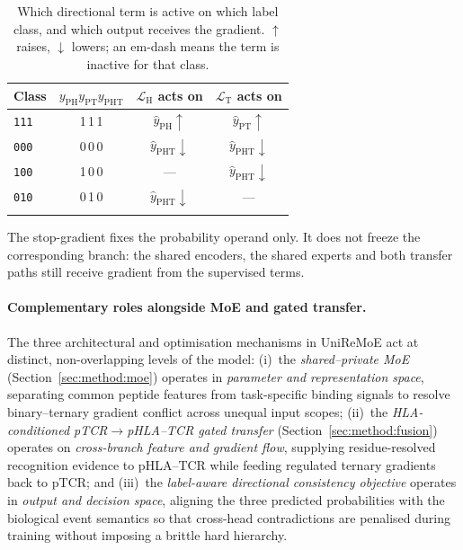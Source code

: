 \documentclass[webpdf,modern,large,namedate]{oup-authoring-template}
\theoremstyle{thmstyleone}
\theoremstyle{thmstyletwo}
\theoremstyle{thmstylethree}
\newcommand{\method}{UniReMoE}
\newcommand{\PT}{pTCR}
\newcommand{\PHT}{pHLA--TCR}
\newcommand{\PHm}{\mathrm{PH}}
\newcommand{\PTm}{\mathrm{PT}}
\newcommand{\PHTm}{\mathrm{PHT}}
\begin{document}
\begin{table}[!t]
\caption{Which directional term is active on which label class, and which
output receives the gradient. $\uparrow$ raises, $\downarrow$ lowers; an
em-dash means the term is inactive for that class.\label{tab:consistency}}
\begin{tabular*}{\columnwidth}{@{\extracolsep\fill}lccc@{\extracolsep\fill}}
\toprule
Class & $y_{\PHm}y_{\PTm}y_{\PHTm}$
& $\mathcal{L}_{\mathrm{H}}$ acts on & $\mathcal{L}_{\mathrm{T}}$ acts on\\
\midrule
\texttt{111} & 1\,1\,1 & $\hat y_{\PHm}\uparrow$   & $\hat y_{\PTm}\uparrow$\\
\texttt{000} & 0\,0\,0 & $\hat y_{\PHTm}\downarrow$ & $\hat y_{\PHTm}\downarrow$\\
\texttt{100} & 1\,0\,0 & ---                         & $\hat y_{\PHTm}\downarrow$\\
\texttt{010} & 0\,1\,0 & $\hat y_{\PHTm}\downarrow$ & ---\\
\botrule
\end{tabular*}
\begin{tablenotes}%
\item The stop-gradient fixes the probability operand only. It does not freeze
the corresponding branch: the shared encoders, the shared experts and both
transfer paths still receive gradient from the supervised terms.
\end{tablenotes}
\end{table}

\paragraph{Complementary roles alongside MoE and gated transfer.}
The three architectural and optimisation mechanisms in \method{} act at
distinct, non-overlapping levels of the model:
(i)~the \emph{shared--private MoE} (Section~\ref{sec:method:moe}) operates in
\emph{parameter and representation space}, separating common peptide features
from task-specific binding signals to resolve binary--ternary gradient
conflict across unequal input scopes;
(ii)~the \emph{HLA-conditioned \PT{}$\rightarrow$\PHT{} gated transfer}
(Section~\ref{sec:method:fusion}) operates on \emph{cross-branch feature and
gradient flow}, supplying residue-resolved recognition evidence to \PHT{} while
feeding regulated ternary gradients back to \PT{}; and
(iii)~the \emph{label-aware directional consistency objective} operates in
\emph{output and decision space}, aligning the three predicted probabilities
with the biological event semantics so that cross-head contradictions are
penalised during training without imposing a brittle hard hierarchy.
\end{document}
